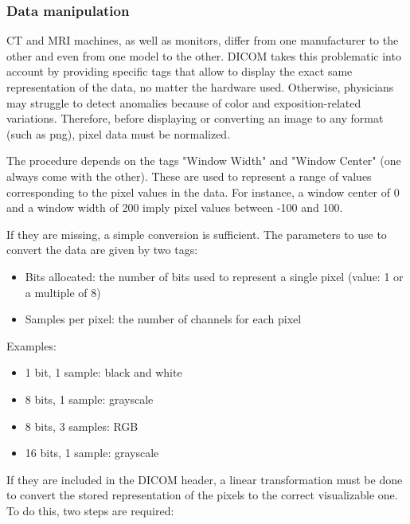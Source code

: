 \subsubsection{Data manipulation}
\label{sec:dicom_data_manipulation}
CT and MRI machines, as well as monitors, differ from one manufacturer to the other and even from one model to the other. DICOM takes this problematic into account by providing specific tags that allow to display the exact same representation of the data, no matter the hardware used. Otherwise, physicians may struggle to detect anomalies because of color and exposition-related variations. 
Therefore, before displaying or converting an image to any format (such as png), pixel data must be normalized. 

The procedure depends on the tags "Window Width" and "Window Center" (one always come with the other). These are used to represent a range of values corresponding to the pixel values in the data. For instance, a window center of 0 and a window width of 200 imply pixel values between -100 and 100. 

If they are missing, a simple conversion is sufficient. The parameters to use to convert the data are given by two tags: 
\begin{itemize}
	\item Bits allocated: the number of bits used to represent a single pixel (value: 1 or a multiple of 8)
	\item Samples per pixel: the number of channels for each pixel

\end{itemize}

\noindent Examples: 
\begin{itemize}
\item 1 bit, 1 sample: black and white
\item 8 bits, 1 sample: grayscale
\item 8 bits, 3 samples: RGB
\item 16 bits, 1 sample: grayscale

\end{itemize} 

\noindent If they are included in the DICOM header, a linear transformation must be done to convert the stored representation of the pixels to the correct visualizable one. To do this, two steps are required: 


